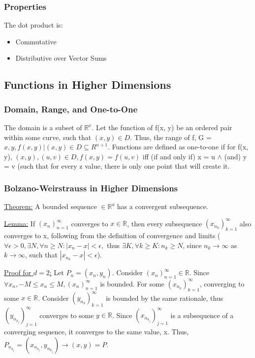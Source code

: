 \documentclass[11 pt, twoside]{article}
\begin{document}
\subsubsection{Properties}
The dot product is:
\begin{itemize}
\item Commutative
\item Distributive over Vector Sums
\end{itemize}

\subsection{Functions in Higher Dimensions}
\subsubsection{Domain, Range, and One-to-One}
The domain is a subset of $\mathbb{R^n}$.
Let the function of f(x, y) be an ordered pair within some curve, such that $(x, y) \in D$. Thus, the range of f, G = ${x, y, f(x,y) | (x, y) \in D} \subseteq{R^{n+1}}$.
Functions are defined as one-to-one if for f(x, y), $(x, y), (u, v) \in D, f(x, y) = f(u, v)$ iff (if and only if) x = u $\wedge$ (and) y = v (such that for every z value, there is only one point that will create it.

\subsubsection{Bolzano-Weirstrauss in Higher Dimensions}
\underline{Theorem:} A bounded sequence $\in \mathbb{R^d}$ has a convergent subsequence.

\underline{Lemma:} If $(x_n)_{n=1}^\infty$ converges to $x \in \mathbb{R}$, then every subsequence $(x_{n_k})_{k=1}^\infty$ also converges to x, following from the definition of convergence and limits ($\forall \epsilon > 0, \exists N, \forall n \geq N: |x_n - x| < \epsilon,$ thus $\exists K, \forall k \geq K: n_k \geq N$, since $n_k \to \infty$ as $k \to \infty$, such that $|x_{n_k} - x| < \epsilon$).

\underline{Proof for $d = 2$:} Let $P_n = (x_n, y_n)$. Consider $(x_n)_{n=1}^\infty \in \mathbb{R}$. Since $\forall x_n, -M \leq x_n \leq M, (x_n)_{n=1}^\infty$ is bounded. For some $(x_{n_k})_{k=1}^\infty$, converging to some $x \in \mathbb{R}$. Consider $(y_{n_k})_{k=1}^\infty$ is bounded by the same rationale, thus $(y_{n_{k_j}})^\infty_{j=1}$ converges to some $y \in \mathbb{R}$. Since $(x_{n_{k_j}})_{j=1}^\infty$ is a subsequence of a converging sequence, it converges to the same value, x. Thus, $P_{n_{k_j}} = (x_{n_{k_j}}, y_{n_{k_j}}) \to (x, y) = P$.
\end{document}
